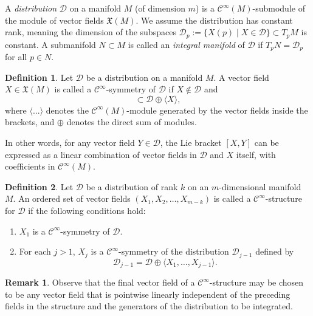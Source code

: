 \documentclass{article}
\theoremstyle{remark}
\theoremstyle{definition}
\newtheorem{definition}{Definition}[section]
\newtheorem{remark}{Remark}[section]
\newcommand{\cinf}{$\mathcal{C}^{\infty}$}
\begin{document}
A \emph{distribution} $\mathcal{D}$ on a manifold $M$ (of dimension $m$) is a $\mathcal{C}^{\infty}(M)$-submodule of the module of vector fields $\mathfrak{X}(M)$. We assume the distribution has constant rank, meaning the dimension of the subspaces $\mathcal{D}_p := \{X(p) \mid X \in \mathcal{D}\} \subset T_pM$ is constant.
A submanifold $N\subset M$ is called an \emph{integral manifold} of $\mathcal{D}$
if $T_pN=\mathcal{D}_p$ for all $p\in N$.
\begin{definition}
Let $\mathcal{D}$ be a distribution on a manifold $M$. A vector field $X \in \mathfrak{X}(M)$ is called a \cinf-symmetry of $\mathcal{D}$ if $X\notin \mathcal{D}$ and
\begin{equation}
    [X, \mathcal{D}] \subset \mathcal{D} \oplus \langle X \rangle,
\end{equation}
where $\langle ... \rangle$ denotes the $\mathcal{C}^{\infty}(M)$-module generated by the vector fields inside the brackets, and $\oplus$ denotes the direct sum of modules.

In other words, for any vector field $Y \in \mathcal{D}$, the Lie bracket $[X, Y]$ can be expressed as a linear combination of vector fields in $\mathcal{D}$ and $X$ itself, with coefficients in $\mathcal{C}^{\infty}(M)$.
\end{definition}

\begin{definition}\label{def1}
Let $\mathcal{D}$ be a distribution of rank $k$ on an $m$-dimensional manifold $M$. An ordered set of vector fields $(X_1, X_2, \dots, X_{m-k})$ is called a \cinf-structure for $\mathcal{D}$ if the following conditions hold:
\begin{enumerate}
    \item $X_1$ is a \cinf-symmetry of $\mathcal{D}$.
    \item For each $j > 1$, $X_j$ is a \cinf-symmetry of the distribution $\mathcal{D}_{j-1}$ defined by
    \begin{equation}
        \mathcal{D}_{j-1} = \mathcal{D} \oplus \langle X_1, \dots, X_{j-1} \rangle.
    \end{equation}
\end{enumerate}
\end{definition}


\begin{remark}\label{rem:last}
Observe that the final vector field of a \cinf-structure may be chosen to be any vector field that is pointwise linearly independent of the preceding fields in the structure and the generators of the distribution to be integrated.
\end{remark}
\end{document}
